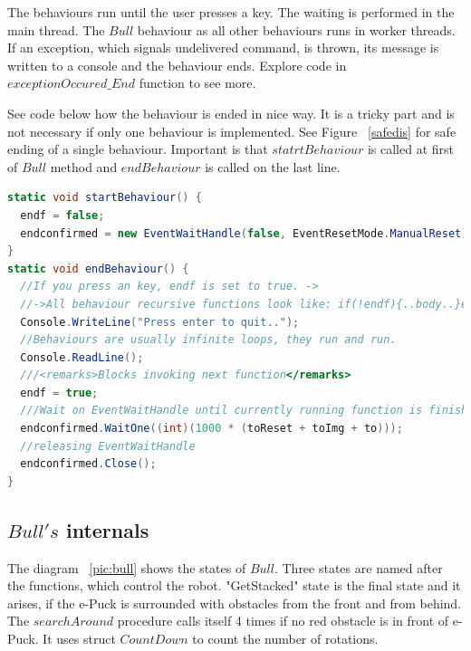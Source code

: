   The behaviours run until the user presses a key. The waiting is performed in the main thread. 
  The $Bull$ behaviour as all other behaviours runs in worker threads.
  If an exception, which signals undelivered command, is thrown, 
  its message is written to a console and the behaviour ends. 
  Explore code in $exceptionOccured\_End$ function to see more.

  See code below how the behaviour is ended in nice way. 
  It is a tricky part and is not necessary if only one behaviour is implemented. See Figure ~\ref{safedis}
  for safe ending of a single behaviour.
  Important is that $statrtBehaviour$ is called at first of $Bull$ method and $endBehaviour$ is called on the last line.
\begin{lstlisting}[language=cs]
static void startBehaviour() {
  endf = false;
  endconfirmed = new EventWaitHandle(false, EventResetMode.ManualReset);
}
static void endBehaviour() {        
  //If you press an key, endf is set to true. ->
  //->All behaviour recursive functions look like: if(!endf){..body..}else endconfirmed.Set();
  Console.WriteLine("Press enter to quit..");
  //Behaviours are usually infinite loops, they run and run.
  Console.ReadLine();
  ///<remarks>Blocks invoking next function</remarks>
  endf = true;
  ///Wait on EventWaitHandle until currently running function is finished.
  endconfirmed.WaitOne((int)(1000 * (toReset + toImg + to)));
  //releasing EventWaitHandle
  endconfirmed.Close();
}
\end{lstlisting}

\subsection{$Bull's$ internals} \label{bull}
  The diagram ~\ref{pic:bull} shows the states of $Bull$.
  Three states are named after the functions, which control the robot. "GetStacked" state
  is the final state and it arises, if the e-Puck is surrounded with obstacles from the front and from behind.
  The $searchAround$ procedure calls itself 4 times if no red obstacle is in front of e-Puck.
  It uses struct $CountDown$ to count the number of rotations.

